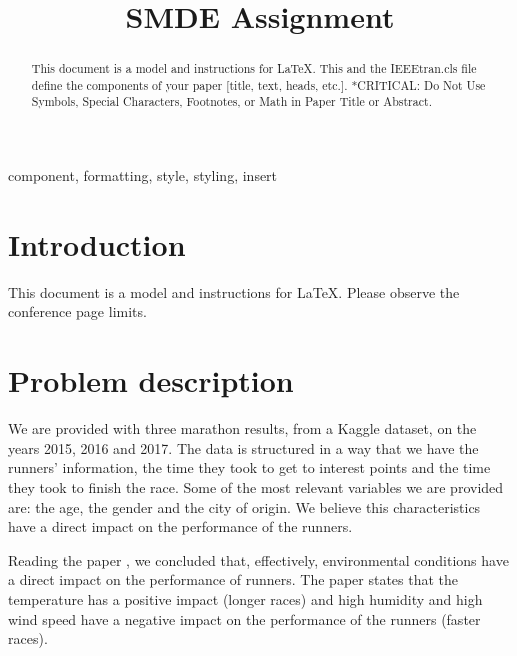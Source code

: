 \documentclass[conference]{IEEEtran}
\begin{document}
\title{SMDE Assignment}

\author{
\and
{}
\and
{}
}

\maketitle

\begin{abstract}
This document is a model and instructions for \LaTeX.
This and the IEEEtran.cls file define the components of your paper [title, text, heads, etc.]. *CRITICAL: Do Not Use Symbols, Special Characters, Footnotes, 
or Math in Paper Title or Abstract.
\end{abstract}

\begin{IEEEkeywords}
component, formatting, style, styling, insert
\end{IEEEkeywords}

\section*{Introduction}
This document is a model and instructions for \LaTeX.
Please observe the conference page limits. 

\section{Problem description}
We are provided with three marathon results, from a Kaggle dataset, on the years 2015, 2016 and 2017. The data is structured in a way that we have the runners' information, the time they took to get to interest points and the time they took to finish the race. Some of the most relevant variables we are provided are: the age, the gender and the city of origin. We believe this characteristics have a direct impact on the performance of the runners.

Reading the paper \cite{b8}, we concluded that, effectively, environmental conditions have a direct impact on the performance of runners. The paper states that the temperature has a positive impact (longer races) and high humidity and high wind speed have a negative impact on the performance of the runners (faster races).
\end{document}
